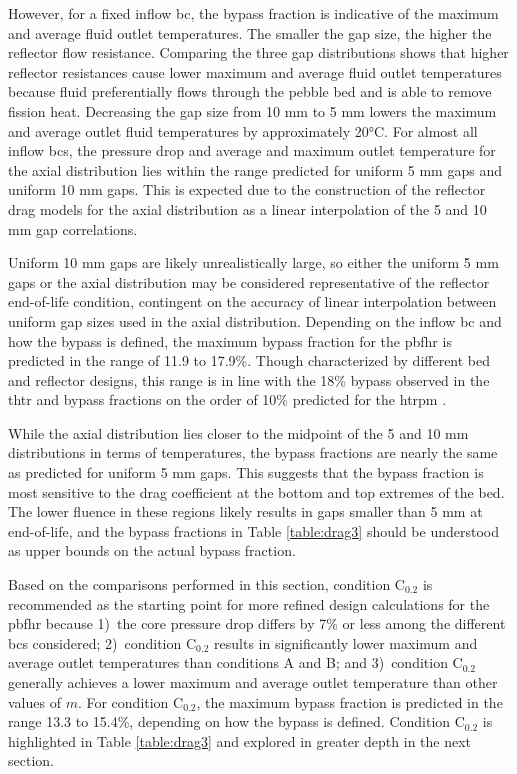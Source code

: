 However, for a fixed inflow \gls{bc}, the bypass fraction is indicative of the maximum and average fluid outlet temperatures. The smaller the gap size, the higher the reflector flow resistance. Comparing the three gap distributions shows that higher reflector resistances cause lower maximum and average fluid outlet temperatures because fluid preferentially flows through the pebble bed and is able to remove fission heat. Decreasing the gap size from 10 \si{\milli\meter} to 5 \si{\milli\meter} lowers the maximum and average outlet fluid temperatures by approximately 20\si{\celsius}. For almost all inflow \glspl{bc}, the pressure drop and average and maximum outlet temperature for the axial distribution lies within the range predicted for uniform 5 \si{\milli\meter} gaps and uniform 10 \si{\milli\meter} gaps. This is expected due to the construction of the reflector drag models for the axial distribution as a linear interpolation of the 5 and 10 \si{\milli\meter} gap correlations. 

Uniform 10 \si{\milli\meter} gaps are likely unrealistically large, so either the uniform 5 \si{\milli\meter} gaps or the axial distribution may be considered representative of the reflector end-of-life condition, contingent on the accuracy of linear interpolation between uniform gap sizes used in the axial distribution. Depending on the inflow \gls{bc} and how the bypass is defined, the maximum bypass fraction for the \gls{pbfhr} is predicted in the range of 11.9 to 17.9\%. Though characterized by different bed and reflector designs, this range is in line with the 18\% bypass observed in the \gls{thtr} \cite{baumer} and bypass fractions on the order of 10\% predicted for the \gls{htrpm} \cite{jun,jun2011}.

While the axial distribution lies closer to the midpoint of the 5 and 10 \si{\milli\meter} distributions in terms of temperatures, the bypass fractions are nearly the same as predicted for uniform 5 \si{\milli\meter} gaps. This suggests that the bypass fraction is most sensitive to the drag coefficient at the bottom and top extremes of the bed. The lower fluence in these regions likely results in gaps smaller than 5 \si{\milli\meter} at end-of-life, and the bypass fractions in Table \ref{table:drag3} should be understood as upper bounds on the actual bypass fraction.

Based on the comparisons performed in this section, condition C$_{0.2}$ is recommended as the starting point for more refined design calculations for the \gls{pbfhr} because 1)~the core pressure drop differs by 7\% or less among the different \glspl{bc} considered; 2)~condition C$_\text{0.2}$ results in significantly lower maximum and average outlet temperatures than conditions A and B; and 3)~condition C$_\text{0.2}$ generally achieves a lower maximum and average outlet temperature than other values of \(m\). For condition C$_{0.2}$, the maximum bypass fraction is predicted in the range 13.3 to 15.4\%, depending on how the bypass is defined. Condition C$_{0.2}$ is highlighted in Table \ref{table:drag3} and explored in greater depth in the next section.

